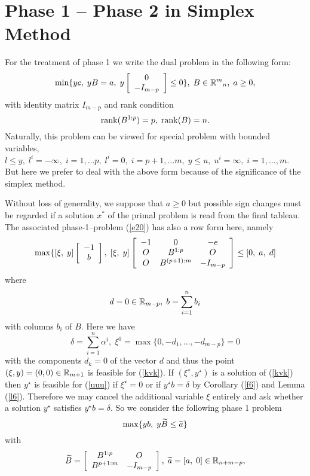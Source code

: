 \section{Phase 1 -- Phase 2 in Simplex Method}
For the treatment of phase 1 we write the dual problem
in the following form:
%
\begin{equation} \label{uuu}
\min \{yc, \; yB = a, \; y\ba{[}{cc}0 \\ - I_{m-p}\ea{]} \leq 0\},
\; B \in \Bbb{R}^m{}_n, \; a \geq 0,
\end{equation}
%
with identity matrix $I_{m-p}$ and rank condition
%
\[
\rank (B^{1:p}) = p, \; \rank (B) = n.
\]
%
Naturally, this problem can be viewed for special problem with bounded
variables, $l \leq y, \;  l^i = - \infty, \; i = 1, \ldots p, \; l^i
= 0, \; i = p+1, \ldots m, \; y \leq u, \; u^i = \infty, \; i = 1, \ldots, m$.
But here we prefer to deal with the above form because of the significance
of the simplex method.
\par
Without loss of generality, we suppose that $a \geq 0$ but possible sign
changes must be regarded if a solution $x^*$ of the primal problem is read from
the final tableau.  The associated phase-1--problem (\ref{e20}) has also a row
form here, namely
%
\begin{equation} \label{kvk}
\max \{[\xi, \; y]\ba{[}{c}-1 \\b\ea{]}, \;
[\xi , \; y]\ba{[}{ccc} -1 & 0 & - e\\ O & B^{1:p}  & O\\
O & B^{(p+1):m} & -I_{m-p} \ea{]} \leq [0, \; a, \; d]
\end{equation}
where
\[
d = 0 \in \Bbb{R}_{m-p}, \; b = \sum_{i=1}^nb_i
\]
with columns $b_i$ of $B$. Here we have
\[
\delta  = \sum_{i=1}^n\alpha ^i, \;
\xi ^0 = \max\{0, - d_1, \ldots, - d_{m-p}\} = 0
\]
with the components $d_k = 0$ of the vector $d$ and thus the point $(\xi ,y) =
(0,0) \in \Bbb{R}_{m+1}$ is feasible for (\ref{kvk}).  If $(\xi
^{\star},y^{\star})$ is a solution of (\ref{kvk}) then $y^{\star}$ is feasible
for (\ref{uuu}) if $\xi ^{\star} = 0$ or if $y^{\star}b = \delta $ by Corollary
(\ref{f6}) and Lemma (\ref{l6}).  Therefore we may cancel the additional
variable $\xi $ entirely and ask whether a solution $y^{\star}$ satisfies
$y^{\star}b = \delta$.  So we consider the following phase 1 problem
%
\begin{equation} \label{sv1}
\max \{yb, \; y\wi{B} \leq \wi{a} \}
\end{equation}
with
\begin{equation} \label{sv2}
\wi{B} =  \ba{[}{cc} B^{1:p} & O\\ B^{p+1:m} & -I_{m-p}\ea{]}, \;
\wi{a} =  [ a, \; 0] \in \Bbb{R}_{n+m-p},
\end{equation}
